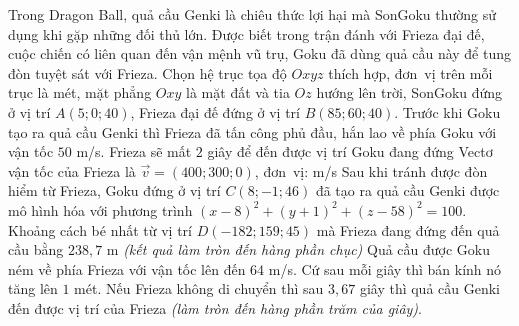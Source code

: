 \begin{ex}%
	Trong Dragon Ball, quả cầu Genki là chiêu thức lợi hại mà SonGoku thường sử dụng khi gặp những đối thủ lớn. Được biết trong trận đánh với Frieza đại đế, cuộc chiến  có liên quan đến vận mệnh vũ trụ, Goku đã dùng quả cầu này để tung đòn tuyệt sát với Frieza.
	Chọn hệ trục tọa độ $Oxyz$ thích hợp, đơn~vị trên mỗi trục là mét, mặt phẳng $Oxy$ là mặt đất và tia $Oz$ hướng lên trời, SonGoku đứng ở vị trí $A(5; 0; 40)$, Frieza  đại đế đứng ở vị trí $B(85; 60; 40)$. Trước khi Goku tạo ra quả cầu Genki thì Frieza đã tấn công phủ đầu, hắn lao về phía Goku với vận tốc $50$ m/s.
	 \choiceTF
		 {\True Frieza sẽ mất $2$ giây để đến được vị trí Goku đang đứng}
		{Vectơ vận tốc của Frieza là $\overrightarrow{v}=(400; 300;  0)$, đơn~vị: m/s}
		{\True Sau khi tránh được đòn hiểm từ Frieza, Goku đứng ở vị trí $C(8;-1; 46)$  đã tạo ra quả cầu Genki được mô hình hóa với phương trình $(x-8)^2+(y+1)^2+(z-58)^2=100$. Khoảng cách bé nhất từ vị trí $D(-182; 159; 45)$ mà Frieza đang đứng đến quả cầu bằng $238{,}7$ m \textit{(kết quả làm tròn đến hàng phần chục)}}
		{\True Quả cầu được Goku ném về phía Frieza với vận tốc lên đến $64$ m/s. Cứ sau mỗi giây thì bán kính nó tăng lên $1$ mét. Nếu Frieza không di chuyển thì sau $3{,}67$ giây thì quả cầu Genki đến  được vị trí của Frieza \textit{(làm tròn đến hàng phần trăm của giây)}.}
\end{ex}
